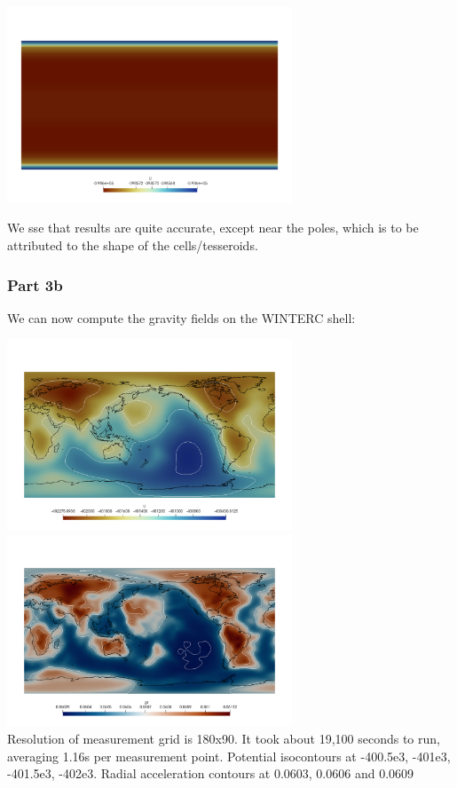 \begin{center}
\includegraphics[width=8.5cm]{python_codes/fieldstone_98/images/benchconst/U.png}
\end{center}

We sse that results are quite accurate, except near the poles, which is to 
be attributed to the shape of the cells/tesseroids. 

\subsubsection*{Part 3b}
 
We can now compute the gravity fields on the WINTERC shell:

\begin{center}
\includegraphics[width=8.5cm]{python_codes/fieldstone_98/images/U}
\includegraphics[width=8.5cm]{python_codes/fieldstone_98/images/gr}\\
{\captionfont Resolution of measurement grid is 180x90. It took 
about 19,100 seconds to run, averaging 1.16s per measurement point.  
Potential isocontours at -400.5e3, -401e3, -401.5e3, -402e3. 
Radial acceleration contours at 0.0603, 0.0606 and 0.0609}
\end{center}

